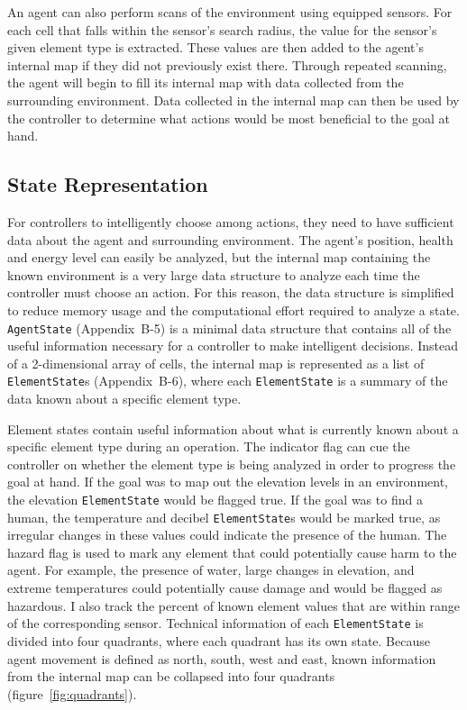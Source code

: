 An agent can also perform scans of the environment using equipped sensors.
For each cell that falls within the sensor's search radius, the value for the sensor's given element type is extracted.
These values are then added to the agent's internal map if they did not previously exist there.
Through repeated scanning, the agent will begin to fill its internal map with data collected from the surrounding environment.
Data collected in the internal map can then be used by the controller to determine what actions would be most beneficial to the goal at hand.


\subsection{State Representation} \label{subsec:state_representation}
For controllers to intelligently choose among actions, they need to have sufficient data about the agent and surrounding environment.
The agent's position, health and energy level can easily be analyzed, but the internal map containing the known environment is a very large data structure to analyze each time the controller must choose an action.
For this reason, the data structure is simplified to reduce memory usage and the computational effort required to analyze a state.
\texttt{AgentState} (Appendix~B-5) is a minimal data structure that contains all of the useful information necessary for a controller to make intelligent decisions.
Instead of a 2-dimensional array of cells, the internal map is represented as a list of \texttt{ElementState}s (Appendix~B-6), where each \texttt{ElementState} is a summary of the data known about a specific element type.

Element states contain useful information about what is currently known about a specific element type during an operation.
The indicator flag can cue the controller on whether the element type is being analyzed in order to progress the goal at hand.
If the goal was to map out the elevation levels in an environment, the elevation \texttt{ElementState} would be flagged true.
If the goal was to find a human, the temperature and decibel \texttt{ElementState}s would be marked true, as irregular changes in these values could indicate the presence of the human.
The hazard flag is used to mark any element that could potentially cause harm to the agent.
For example, the presence of water, large changes in elevation, and extreme temperatures could potentially cause damage and would be flagged as hazardous.
I also track the percent of known element values that are within range of the corresponding sensor.
Technical information of each \texttt{ElementState} is divided into four quadrants, where each quadrant has its own state.
Because agent movement is defined as north, south, west and east, known information from the internal map can be collapsed into four quadrants (figure~\ref{fig:quadrants}).

